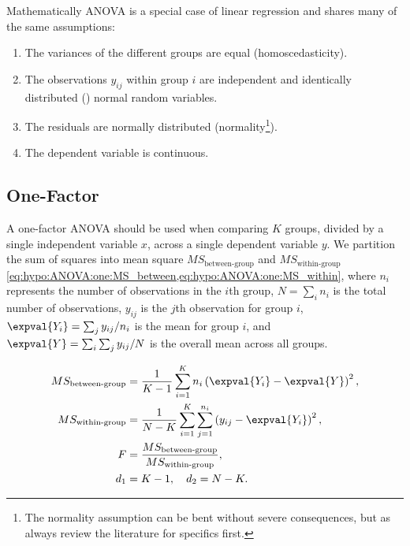 Mathematically ANOVA is a special case of linear regression
and shares many of the same assumptions:

\begin{enumerate}[noitemsep]
  \item The variances of the different groups are equal (homoscedasticity).
  \item The observations $y_{ij}$ within group $i$ are independent and identically distributed (\iid) normal random variables.
  \item The residuals are normally distributed (normality\footnote{The normality assumption can be bent without severe consequences, but as always review the literature for specifics first.}).
  \item The dependent variable is continuous.
\end{enumerate}

\subsection{One-Factor}
\label{hypo:ANOVA:one}

A one-factor ANOVA should be used when comparing $K$ groups,
divided by a single independent variable $x$,
across a single dependent variable $y$.
We partition the sum of squares into
mean square $MS_{\text{between-group}}$ and $MS_{\text{within-group}}$
\cref{eq:hypo:ANOVA:one:MS_between,eq:hypo:ANOVA:one:MS_within}, where
$n_{i}$ represents the number of observations in the $i$th group,
$N = \sum_{i} n_{i}$ is the total number of observations,
$y_{ij}$ is the $j$th observation for group $i$,
$\expval{Y_{i}} = \sum_{j} y_{ij} / n_{i}$ is the mean for group $i$,
and $\expval{Y} = \sum_{i}\sum_{j} y_{ij} / N$ is the overall mean across all groups.

\begin{subequations}\label{eq:hypo:ANOVA:one}
\begin{align}
MS_{\text{between-group}} &= \frac{1}{K-1} \sum_{i=1}^{K} n_{i}\left(\expval{Y_{i}} - \expval{Y}\right)^{2}, \label{eq:hypo:ANOVA:one:MS_between} \\
MS_{\text{within-group}} &= \frac{1}{N-K} \sum_{i=1}^{K} \sum_{j=1}^{n_{i}} \left( y_{ij} - \expval{Y_{i}} \right)^{2}, \label{eq:hypo:ANOVA:one:MS_within} \\
F &= \frac{MS_{\text{between-group}}}{MS_{\text{within-group}}}, \label{eq:hypo:ANOVA:one:F} \\
d_{1} &= K-1,\quad d_{2} = N-K. \label{eq:hypo:ANOVA:one:dof}
\end{align}
\end{subequations}

